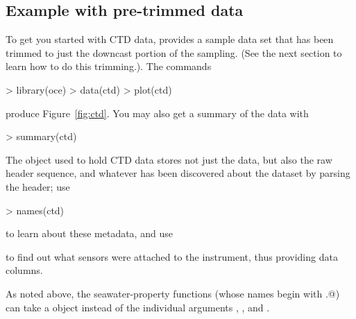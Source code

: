 \documentclass{article}
\begin{document}
\subsection{Example with pre-trimmed data}


To get you started with CTD data, \verb@oce@ provides a sample data set that has
been trimmed to just the downcast portion of the sampling.  (See the next
section to learn how to do this trimming.).  The commands
\begin{Schunk}
\begin{Sinput}
> library(oce)
> data(ctd)
> plot(ctd)
\end{Sinput}
\end{Schunk}
produce Figure~\ref{fig:ctd}. You may also get a summary of the data with
\begin{Schunk}
\begin{Sinput}
> summary(ctd)
\end{Sinput}
\end{Schunk}

The object used to hold CTD data stores not just the data, but also the raw
header sequence, and whatever has been discovered about the dataset by parsing
the header; use
\begin{Schunk}
\begin{Sinput}
> names(ctd)
\end{Sinput}
\end{Schunk}
to learn about these metadata, and use
\begin{Schunk}
\end{Schunk}
to find out what sensors were attached to the instrument, thus providing data columns.

As noted above, the seawater-property functions (whose names begin with
\verb@sw.@) can take a \verb@ctd@ object instead of the individual arguments
\verb@S@, \verb@t@, and \verb@p@.
\end{document}
